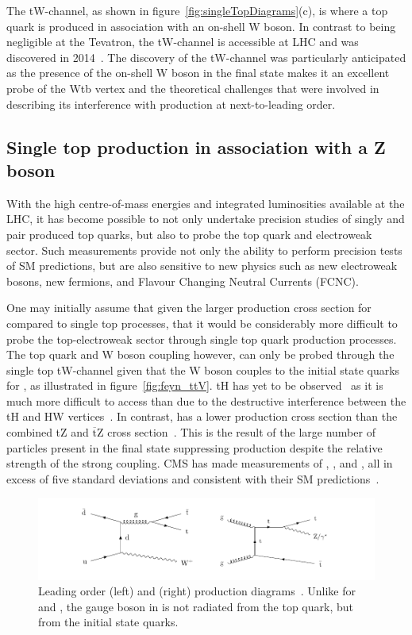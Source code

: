 The tW-channel, as shown in figure~\ref{fig:singleTopDiagrams}(c), is where a top quark is produced in association with an on-shell W boson.
In contrast to being negligible at the Tevatron, the tW-channel is accessible at LHC and was discovered in 2014~\cite{Chatrchyan:2014tua}.
The discovery of the tW-channel was particularly anticipated as the presence of the on-shell W boson in the final state makes it an excellent probe of the Wtb vertex and the theoretical challenges that were involved in describing its interference with \ttbar production at next-to-leading order.

\subsection{Single top production in association with a Z boson}\label{subsec:tZqTheory}
With the high centre-of-mass energies and integrated luminosities available at the LHC, it has become possible to not only undertake precision studies of singly and pair produced top quarks, but also to probe the top quark and electroweak sector.
Such measurements provide not only the ability to perform precision tests of SM predictions, but are also sensitive to new physics such as new electroweak bosons, new fermions, and Flavour Changing Neutral Currents (FCNC).

One may initially assume that given the larger production cross section for \ttbar compared to single top processes, that it would be considerably more difficult to probe the top-electroweak sector through single top quark production processes.
The top quark and W boson coupling however, can only be probed through the single top tW-channel given that the W boson couples to the initial state quarks for \ttW, as illustrated in figure~\ref{fig:feyn_ttV}.
tH has yet to be observed~\cite{CMS:2018jsz} as it is much more difficult to access than \ttH due to the destructive interference between the tH and HW vertices~\cite{Maltoni:2001hu}.
In contrast, \ttZ has a lower production cross section than the combined tZ and $\overline{\text{t}}$Z cross section~\cite{Campbell:2013yla}.
This is the result of the large number of particles present in the \ttZ final state suppressing \ttZ production despite the relative strength of the strong coupling.
CMS has made measurements of \ttH, \ttW, and \ttZ, all in excess of five standard deviations and consistent with their SM predictions~\cite{Sirunyan:2017uzs,Sirunyan:2018hoz}.

\begin{figure}[p]
\centering
\includegraphics[width=\textwidth]{figs/top-physics/CMS-TOP-17-005_Figure_001.pdf}
\caption{Leading order \ttW (left) and \ttZ (right) production diagrams~\cite{Sirunyan:2017uzs}. Unlike for \ttZ and \ttH, the gauge boson in \ttW is not radiated from the top quark, but from the initial state quarks.}
\label{fig:deyn_ttV}
\end{figure}

